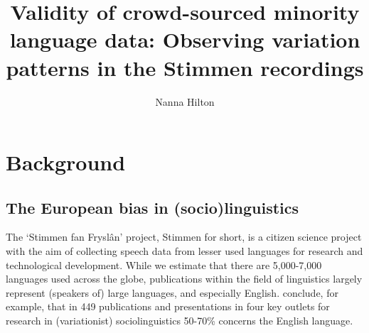 \documentclass[output=paper,hidelinks]{langscibook}
\author{Nanna Hilton\affiliation{University of Groningen}\orcid{}}
\title{Validity of crowd-sourced minority language data: Observing variation patterns in the Stimmen recordings}
\begin{document}
\maketitle 
{}
 

\section{Background}
\subsection{The European bias in (socio)linguistics}

The ‘Stimmen fan Fryslân’ project, Stimmen for short, is a citizen science project with the aim of collecting speech data from lesser used languages for research and technological development. While we estimate that there are 5,000-7,000 languages used across the globe, publications within the field of linguistics largely represent (speakers of) large languages, and especially English. \citet{Nagy2008} conclude, for example, that in 449 publications and presentations in four key outlets for research in (variationist) sociolinguistics 50-70\% concerns the English language. 
\end{document}
